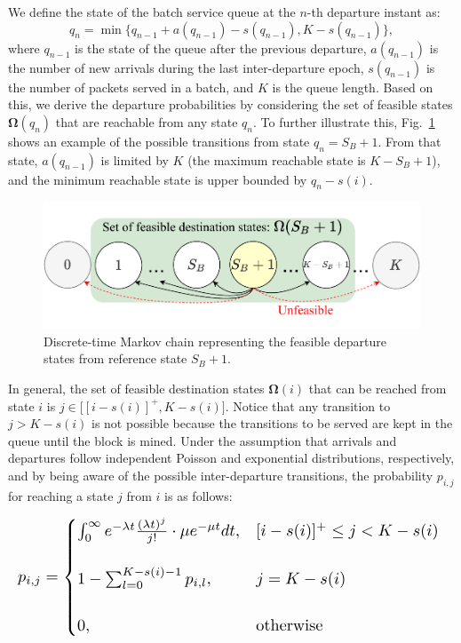 \documentclass[conference]{IEEEtran}
\theoremstyle{definition}
\begin{document}
We define the state of the batch service queue at the $n$-th departure instant as:
\begin{equation}
  q_n = 
    \min \Big\{ q_{n-1} + a(q_{n-1}) - s(q_{n-1}), K - s(q_{n-1}) \Big\},
\end{equation}
where $q_{n-1}$ is the state of the queue after the previous departure, $a(q_{n-1})$ is the number of new arrivals during the last inter-departure epoch, $s(q_{n-1})$ is the number of packets served in a batch, and $K$ is the queue length. Based on this, we derive the departure probabilities by considering the set of feasible states $\boldsymbol{\Omega}(q_n)$ that are reachable from any state $q_n$. To further illustrate this, Fig.~\ref{fig:markov_chain} shows an example of the possible transitions from state $q_n = S_B+1$. From that state, $a(q_{n-1})$ is limited by $K$ (the maximum reachable state is $K-S_B+1$), and the minimum reachable state is upper bounded by $q_n - s(i)$.

\begin{figure}[ht!]
\centering
\includegraphics[width=.9\columnwidth]{markov_chain_1.pdf}
\caption{Discrete-time Markov chain representing the feasible departure states from reference state $S_B + 1$.}
\label{fig:markov_chain}
\end{figure}

In general, the set of feasible destination states $\boldsymbol{\Omega}(i)$ that can be reached from state $i$ is $j \in \big[ [i-s(i)]^+, K-s(i) \big]$. Notice that any transition to $j > K-s(i)$ is not possible because the transitions to be served are kept in the queue until the block is mined. Under the assumption that arrivals and departures follow independent Poisson and exponential distributions, respectively, and by being aware of the possible inter-departure transitions, the probability $p_{i,j}$ for reaching a state $j$ from $i$ is as follows:

\begin{equation}
  \resizebox{\linewidth}{!}{%
  $p_{i,j} = \begin{cases}
    \int_{0}^\infty e^{-\lambda t} \frac{(\lambda t)^{j}}{j!} \cdot \mu e^{-\mu t} dt, & [i - s(i)]^+ \leq j < K - s(i)
    \\
    \\
    1-\sum^{K-s(i)-1}_{l=0} p_{i,l}, & j = K - s(i)
    \\
    \\
    0, & \text{otherwise}
    \end{cases}$
    }
\end{equation}
\end{document}
